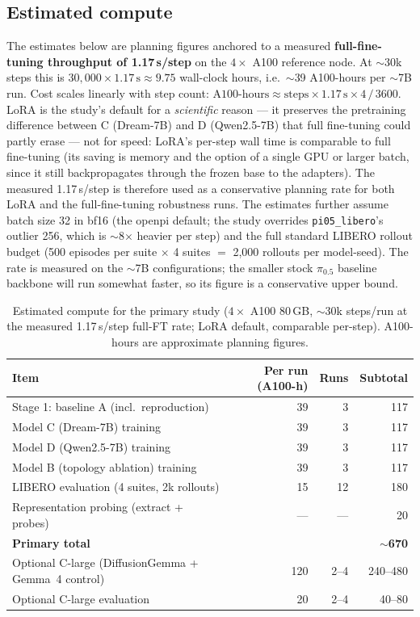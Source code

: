 \documentclass[11pt]{article}
\begin{document}
\subsection{Estimated compute}

The estimates below are planning figures anchored to a measured \textbf{full-fine-tuning throughput of 1.17\,s/step} on the $4\times$ A100 reference node. At $\sim$30k steps this is $30{,}000 \times 1.17\,\text{s} \approx 9.75$ wall-clock hours, i.e.\ $\sim$39 A100-hours per $\sim$7B run. Cost scales linearly with step count: $\text{A100-hours} \approx \text{steps} \times 1.17\,\text{s} \times 4\,/\,3600$. LoRA is the study's default for a \emph{scientific} reason --- it preserves the pretraining difference between C (Dream-7B) and D (Qwen2.5-7B) that full fine-tuning could partly erase --- not for speed: LoRA's per-step wall time is comparable to full fine-tuning (its saving is memory and the option of a single GPU or larger batch, since it still backpropagates through the frozen base to the adapters). The measured 1.17\,s/step is therefore used as a conservative planning rate for both LoRA and the full-fine-tuning robustness runs. The estimates further assume batch size 32 in bf16 (the openpi default; the study overrides \texttt{pi05\_libero}'s outlier 256, which is $\sim$8$\times$ heavier per step) and the full standard LIBERO rollout budget (500 episodes per suite $\times$ 4 suites $=$ 2{,}000 rollouts per model-seed). The rate is measured on the $\sim$7B configurations; the smaller stock $\pi_{0.5}$ baseline backbone will run somewhat faster, so its figure is a conservative upper bound.

\begin{table}[h!]
\centering
\caption{Estimated compute for the primary study ($4\times$ A100 80\,GB, $\sim$30k steps/run at the measured 1.17\,s/step full-FT rate; LoRA default, comparable per-step). A100-hours are approximate planning figures.}
\begin{tabularx}{\linewidth}{X r r r}
\toprule
Item & Per run (A100-h) & Runs & Subtotal \\
\midrule
Stage 1: baseline A (incl.\ reproduction) & 39 & 3 & 117 \\
Model C (Dream-7B) training & 39 & 3 & 117 \\
Model D (Qwen2.5-7B) training & 39 & 3 & 117 \\
Model B (topology ablation) training & 39 & 3 & 117 \\
LIBERO evaluation (4 suites, 2k rollouts) & 15 & 12 & 180 \\
Representation probing (extract + probes) & --- & --- & 20 \\
\midrule
\textbf{Primary total} & & & \textbf{$\sim$670} \\
\midrule
Optional \mbox{C-large} (DiffusionGemma + Gemma~4 control) & 120 & 2--4 & 240--480 \\
Optional \mbox{C-large} evaluation & 20 & 2--4 & 40--80 \\
\bottomrule
\end{tabularx}
\end{table}
\end{document}
